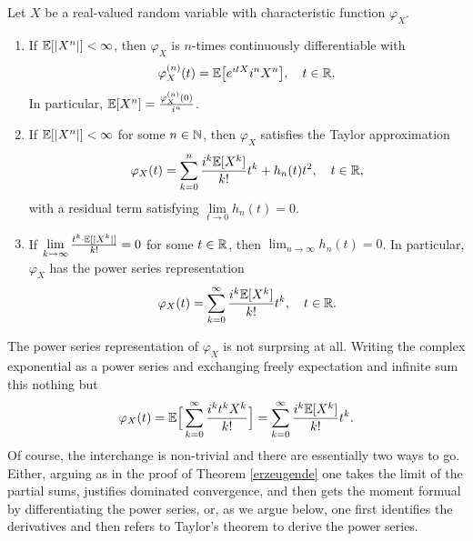 \begin{lsatz}
\begin{theorem}\label{theorem_moments}
	Let $X$ be a real-valued random variable with characteristic function $\varphi_X$.
	\begin{enumerate}[label=(\roman*)]
		\item
			If $\mathbb{E}[ \lvert X^n \rvert ] < \infty$, then $\varphi_X$ is $n$-times continuously differentiable with $$ \varphi_X^{(n)}(t) = \mathbb{E} \big[ e^{itX}i^n X^n \big], \quad t \in \mathbb{R}.$$
			In particular, $\mathbb{E}[X^n]=\frac{\varphi^{(n)}_X(0)}{i^n }$.
		\item
			If $\mathbb{E} [ \lvert X^n \rvert ] < \infty$ for some $n\in\mathbb{N}$, then $\varphi_X$ satisfies the Taylor approximation
			\begin{align}\label{Taylor}
				\varphi_X(t) = \sum_{k=0}^n \frac{i^k \mathbb{E}[X^k]}{k!} t^k + h_n(t)t^2, \quad t\in \mathbb{R},
			\end{align}
			with a residual term satisfying $\lim\limits_{t \to 0} h_n(t) =0$.
		\item
			If $\lim\limits_{k \to \infty} \frac{t^k \cdot \mathbb{E} [ \lvert X^k \rvert ]}{k!} = 0$ for some $t\in\mathbb{R}$, then $\lim_{n\to\infty} h_n(t) =0$. In particular, $\varphi_X$ has the power series representation
			\begin{align*}
				\varphi_X(t) = \sum_{k=0}^{\infty} \frac{i^k \mathbb{E}[X^k]}{k!}t^k,\quad t\in\mathbb{R}.
			\end{align*}
	\end{enumerate}
\end{theorem}
\end{lsatz}
The power series representation of $\varphi_X$ is not surprsing at all. Writing the complex exponential as a power series and exchanging freely expectation and infinite sum this nothing but
\begin{align*}
	\varphi_X(t)=\mathbb{E}\Big[\sum_{k=0}^\infty \frac{i^kt^kX^k}{k!}\Big]=\sum_{k=0}^\infty \frac{i^k\mathbb{E}[X^k]}{k!}t^k.
\end{align*}
Of course, the interchange is non-trivial and there are essentially two ways to go. Either, arguing as in the proof of Theorem \ref{erzeugende} one takes the limit of the partial sums, justifies dominated convergence, and then gets the moment formual by differentiating the power series, or, as we argue below, one first identifies the derivatives and then refers to Taylor's theorem to derive the power series.
